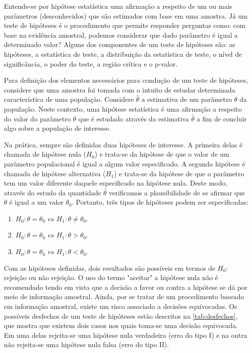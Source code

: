 Entende-se por hipótese estatística uma afirmação a respeito de um ou 
mais parâmetros (desconhecidos) que são estimados com base em uma amostra. Já um teste de hipóteses é o procedimento que permite responder perguntas como: com base na evidência amostral, podemos considerar que dado parâmetro é igual a determinado valor? Alguns dos componentes de um teste de hipóteses são: as hipóteses, a estatística de teste, a distribuição da estatística de teste, o nível de significância, o poder do teste, a região crítica e o p-valor.

Para definição dos elementos necessários para condução de um teste de hipóteses, considere que uma amostra foi tomada com o intuito de estudar determinada característica de uma população. Considere $\hat{\theta}$ a estimativa de um parâmetro $\theta$ da população. Neste contexto, uma hipótese estatística é uma afirmação a respeito do valor do parâmetro $\theta$ que é estudado através da estimativa $\hat{\theta}$ a fim de concluir algo sobre a população de interesse.

Na prática, sempre são definidas duas hipóteses de interesse. A primeira 
delas é chamada de hipótese nula ($H_0$) e trata-se da hipótese de que
o valor de um parâmetro populacional é igual a algum valor especificado. A segunda hipótese é chamada de hipótese alternativa ($H_1$) e trata-se da hipótese de que o parâmetro tem um valor diferente daquele especificado na hipótese nula. Deste modo, através do estudo da quantidade $\hat{\theta}$ verificamos a plausibilidade de se afirmar que $\theta$ é igual a um valor $\theta_0$. Portanto, três tipos de hipóteses podem ser especificadas:

\begin{enumerate}

  \item $H_0: \theta = \theta_0 \, \, vs \, \, H_1: \theta \neq \theta_0$.
  
  \item $H_0: \theta = \theta_0 \, \, vs \, \, H_1: \theta >  \theta_0$.
  
  \item $H_0: \theta = \theta_0 \, \, vs \, \, H_1: \theta < \theta_0$.
  
\end{enumerate}

Com as hipóteses definidas, dois resultados são possíveis em termos de $H_0$: rejeição ou não rejeição. O uso do termo "aceitar" a hipótese nula não é recomendado tendo em vista que a decisão a favor ou contra a hipótese se dá por meio de informação amostral. Ainda, por se tratar de um procedimento baseado em informação amostral, existe um risco associado a decisões equivocadas. Os possíveis desfechos de um teste de hipóteses estão descritos na \autoref{tab:desfechos}, que mostra que existem dois casos nos quais toma-se uma decisão equivocada. Em uma delas rejeita-se uma hipótese nula  verdadeira (erro do tipo I) e na outra não rejeita-se uma hipótese nula falsa (erro do tipo II). 

